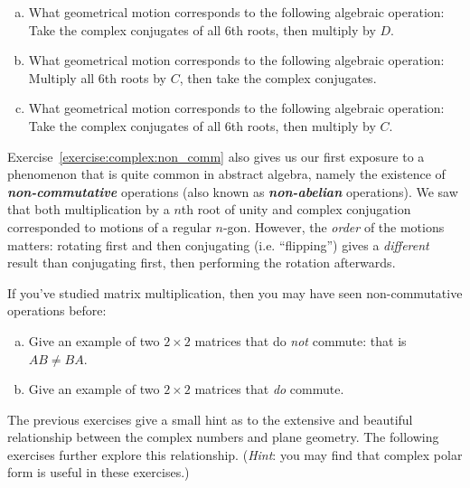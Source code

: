 {\begin{exercise}
\begin{enumerate}[(a)]
\item 
What geometrical motion corresponds to the following algebraic operation:
\indent \indent Take the complex conjugates of all 6th roots, then multiply by  $D$.

\item 
What geometrical motion corresponds to the following algebraic operation:
\indent \indent Multiply all 6th roots by $C$, then take the complex conjugates.

\item 
What geometrical motion corresponds to the following algebraic operation:
\indent \indent Take the complex conjugates of all 6th roots, then multiply by  $C$.

\end{enumerate}
\end{exercise}

Exercise~\ref{exercise:complex:non_comm} also gives us our first exposure to a phenomenon that is quite common in abstract algebra, namely the existence of \textbf{\emph{non-commutative}} operations (also known as \textbf{\emph{non-abelian}} operations).
 We saw that both multiplication by a $n$th root of unity and complex conjugation corresponded to motions of a regular $n$-gon. However, the \emph{order} of the motions matters: rotating first and then conjugating (i.e. ``flipping'') gives a \emph{different} result than conjugating first, then performing the rotation afterwards.

\begin{exercise}\label{exercise:complex:56}
If you've studied matrix multiplication, then you may have seen non-commutative operations before: 
\begin{enumerate}[(a)]
\item
Give an example of two $2\times2$ matrices that do \emph{not} commute: that is $AB \neq BA$.
\item
Give an example of two $2\times2$ matrices that \emph{do} commute.
\end{enumerate}
\end{exercise}

The previous exercises give a small hint as to the extensive and beautiful relationship between the complex numbers and plane geometry.  The following exercises further explore  this relationship.  (\emph{Hint}: you may find that complex polar form is useful in these exercises.)

}
